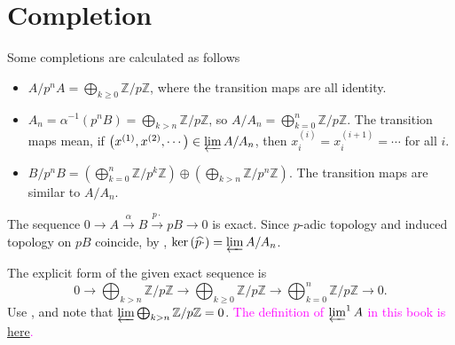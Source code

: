 \section{Completion}

\begin{exercise}\label{ex10.1}
	Some completions are calculated as follows
	\begin{itemize}
		\item $A/p^nA=\bigoplus_{k\geqslant0}\mathbb{Z}/p\mathbb{Z}$, where the transition maps are all identity.
		\item $A_n=\alpha^{-1}\left(p^nB\right)=\bigoplus_{k>n}\mathbb{Z}/p\mathbb{Z}$, so $A/A_n=\bigoplus_{k=0}^n\mathbb{Z}/p\mathbb{Z}$. The transition maps mean, if $\left(x^{(1)},x^{(2)},\cdots\right)\in\varprojlim A/A_n$, then $x^{(i)}_i=x^{(i+1)}_i=\cdots$ for all $i$.
		\item $B/p^nB=\left(\bigoplus_{k=0}^n\mathbb{Z}/p^k\mathbb{Z}\right)\oplus\left(\bigoplus_{k>n}\mathbb{Z}/p^n\mathbb{Z}\right)$. The transition maps are similar to $A/A_n$.
	\end{itemize}
	The sequence $0\rightarrow A\xrightarrow{\alpha}B\xrightarrow{p\cdot}pB\rightarrow0$ is exact. Since $p$-adic topology and induced topology on $pB$ coincide, by , $\ker\left(\widehat{p\cdot}\right)=\varprojlim A/A_n$.
\end{exercise}

\begin{exercise}\label{ex10.2}
	The explicit form of the given exact sequence is
	\begin{equation*}
		0\rightarrow\bigoplus_{k>n}\mathbb{Z}/p\mathbb{Z}\rightarrow\bigoplus_{k\geqslant0}\mathbb{Z}/p\mathbb{Z}\rightarrow\bigoplus_{k=0}^n\mathbb{Z}/p\mathbb{Z}\rightarrow0.
	\end{equation*}
	Use , and note that $\varprojlim\bigoplus_{k>n}\mathbb{Z}/p\mathbb{Z}=0$. \textcolor{magenta}{The definition of $\varprojlim^1A$ in this book is \hyperref[deflim1]{here}.}
\end{exercise}

